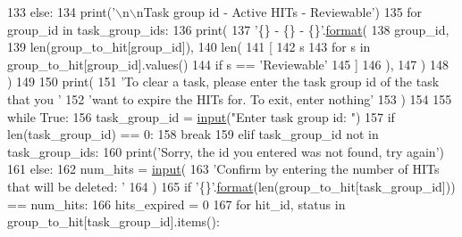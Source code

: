 \begin{DoxyCode}
133     \textcolor{keywordflow}{else}:
134         print(\textcolor{stringliteral}{'\(\backslash\)n\(\backslash\)nTask group id - Active HITs - Reviewable'})
135         \textcolor{keywordflow}{for} group\_id \textcolor{keywordflow}{in} task\_group\_ids:
136             print(
137                 \textcolor{stringliteral}{'\{\} - \{\} - \{\}'}.\hyperlink{namespaceparlai_1_1chat__service_1_1services_1_1messenger_1_1shared__utils_a32e2e2022b824fbaf80c747160b52a76}{format}(
138                     group\_id,
139                     len(group\_to\_hit[group\_id]),
140                     len(
141                         [
142                             s
143                             \textcolor{keywordflow}{for} s \textcolor{keywordflow}{in} group\_to\_hit[group\_id].values()
144                             \textcolor{keywordflow}{if} s == \textcolor{stringliteral}{'Reviewable'}
145                         ]
146                     ),
147                 )
148             )
149 
150     print(
151         \textcolor{stringliteral}{'To clear a task, please enter the task group id of the task that you '}
152         \textcolor{stringliteral}{'want to expire the HITs for. To exit, enter nothing'}
153     )
154 
155     \textcolor{keywordflow}{while} \textcolor{keyword}{True}:
156         task\_group\_id = \hyperlink{namespaceparlai_1_1mturk_1_1core_1_1dev_1_1test_1_1test__full__system_a1e1817cd65688fb90f827834d1fb4567}{input}(\textcolor{stringliteral}{"Enter task group id: "})
157         \textcolor{keywordflow}{if} len(task\_group\_id) == 0:
158             \textcolor{keywordflow}{break}
159         \textcolor{keywordflow}{elif} task\_group\_id \textcolor{keywordflow}{not} \textcolor{keywordflow}{in} task\_group\_ids:
160             print(\textcolor{stringliteral}{'Sorry, the id you entered was not found, try again'})
161         \textcolor{keywordflow}{else}:
162             num\_hits = \hyperlink{namespaceparlai_1_1mturk_1_1core_1_1dev_1_1test_1_1test__full__system_a1e1817cd65688fb90f827834d1fb4567}{input}(
163                 \textcolor{stringliteral}{'Confirm by entering the number of HITs that will be deleted: '}
164             )
165             \textcolor{keywordflow}{if} \textcolor{stringliteral}{'\{\}'}.\hyperlink{namespaceparlai_1_1chat__service_1_1services_1_1messenger_1_1shared__utils_a32e2e2022b824fbaf80c747160b52a76}{format}(len(group\_to\_hit[task\_group\_id])) == num\_hits:
166                 hits\_expired = 0
167                 \textcolor{keywordflow}{for} hit\_id, status \textcolor{keywordflow}{in} group\_to\_hit[task\_group\_id].items():

\end{DoxyCode}
